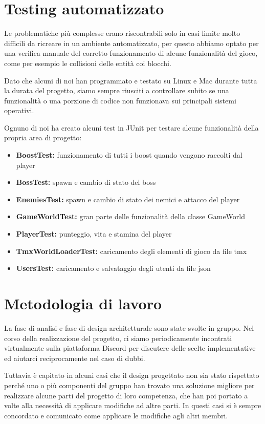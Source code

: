 \documentclass[a4paper,12pt]{report}
\begin{document}
    \section{Testing automatizzato}

    Le problematiche più complesse erano riscontrabili solo in casi limite molto difficili da ricreare in un ambiente automatizzato, per questo abbiamo optato per una verifica manuale del corretto funzionamento di alcune funzionalità del gioco, come per esempio le collisioni delle entità coi blocchi.

    Dato che alcuni di noi han programmato e testato su Linux e Mac durante tutta la durata del progetto, siamo sempre riusciti a controllare subito se una funzionalità o una porzione di codice non funzionava sui principali sistemi operativi.

    Ognuno di noi ha creato alcuni test in JUnit per testare alcune funzionalità della propria area di progetto:
    \begin{itemize}
        \item \textbf{BoostTest:} funzionamento di tutti i boost quando vengono raccolti dal player
        \item \textbf{BossTest:} spawn e cambio di stato del boss
        \item \textbf{EnemiesTest:} spawn e cambio di stato dei nemici e attacco del player
        \item \textbf{GameWorldTest:} gran parte delle funzionalità della classe GameWorld
        \item \textbf{PlayerTest:} punteggio, vita e stamina del player
        \item \textbf{TmxWorldLoaderTest:} caricamento degli elementi di gioco da file tmx
        \item \textbf{UsersTest:} caricamento e salvataggio degli utenti da file json
    \end{itemize}

    \section{Metodologia di lavoro}

    La fase di analisi e fase di design architetturale sono state svolte in gruppo. Nel corso della realizzazione del progetto, ci siamo periodicamente incontrati virtualmente sulla piattaforma Discord per discutere delle scelte implementative ed aiutarci reciprocamente nel caso di dubbi.

    Tuttavia è capitato in alcuni casi che il design progettato non sia stato rispettato perché uno o più componenti del gruppo han trovato una soluzione migliore per realizzare alcune parti del progetto di loro competenza, che han poi portato a volte alla necessità di applicare modifiche ad altre parti. In questi casi si è sempre concordato e comunicato come applicare le modifiche agli altri membri.
\end{document}
